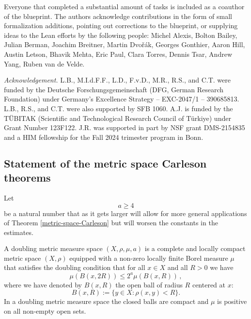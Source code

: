 Everyone that completed a substantial amount of tasks is included as a coauthor of the blueprint.
The authors acknowledge contributions in the form of small formalization additions,
pointing out corrections to the blueprint,
or supplying ideas to the Lean efforts by the following people:
Michel Alexis,
Bolton Bailey,
Julian Berman,
Joachim Breitner,
Martin Dvoř\'ak,
Georges Gonthier,
Aaron Hill,
Austin Letson,
Bhavik Mehta,
Eric Paul,
Clara Torres,
Dennis Tsar,
Andrew Yang,
Ruben van de Velde.

\noindent \textit{Acknowledgement.}
L.B., M.I.d.F.F., L.D., F.v.D., M.R., R.S., and C.T. were funded by the Deutsche For\-schungs\-gemein\-schaft (DFG, German Research Foundation) under Germany's Excellence Strategy -- EXC-2047/1 -- 390685813.
L.B., R.S., and C.T. were also supported by SFB 1060.
A.J. is funded by the T\"UBITAK (Scientific and Technological Research Council of T\"urkiye) under Grant Number 123F122.
J.R. was supported in part by NSF grant DMS-2154835 and a HIM fellowship for the Fall 2024 trimester program in Bonn.

\subsection{Statement of the metric space Carleson theorems}

Let
\begin{equation}
    a\ge 4
\end{equation}
be a natural number that as it gets larger will allow for more general applications of Theorem \ref{metric-space-Carleson}
but will worsen the constants in the estimates.


A doubling metric measure space $(X,\rho,\mu, a)$ is a complete
and locally compact metric space $(X,\rho)$
equipped with a non-zero locally finite Borel measure $\mu$ that satisfies the doubling condition that for all $x\in X$ and all $R>0$ we have
\begin{equation}\label{doublingx}
    \mu(B(x,2R))\le 2^a\mu(B(x,R))\,,
\end{equation}
where we have denoted by $B(x,R)$ the open ball of radius $R$ centered at $x$:
\begin{equation}\label{eq-define-ball}
 B(x,R):=\{y\in X: \rho(x,y)<R\}. \end{equation}
In a doubling metric measure space the closed balls are compact and $\mu$ is positive on all non-empty open sets.

